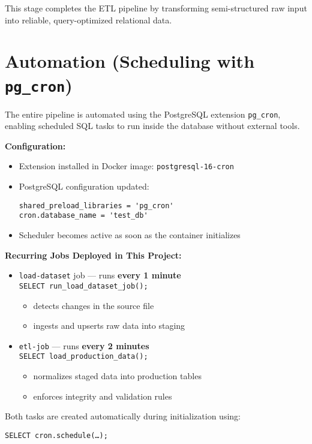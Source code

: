 \documentclass[11pt]{article}
\begin{document}
This stage completes the ETL pipeline by transforming semi-structured raw input into reliable, query-optimized relational data.

\section{Automation (Scheduling with \texttt{pg\_cron})}

The entire pipeline is automated using the PostgreSQL extension \texttt{pg\_cron}, enabling scheduled SQL tasks to run inside the database without external tools.

\textbf{Configuration:}
\begin{itemize}
\item Extension installed in Docker image: \texttt{postgresql-16-cron}
\item PostgreSQL configuration updated:
\begin{verbatim}
shared_preload_libraries = 'pg_cron'
cron.database_name = 'test_db'
\end{verbatim}
\item Scheduler becomes active as soon as the container initializes
\end{itemize}

\textbf{Recurring Jobs Deployed in This Project:}
\begin{itemize}[leftmargin=1.4em]
  \item \texttt{load-dataset} job — runs \textbf{every 1 minute} \\
        \texttt{SELECT run\_load\_dataset\_job();}
        \begin{itemize}
            \item detects changes in the source file
            \item ingests and upserts raw data into staging
        \end{itemize}

  \item \texttt{etl-job} — runs \textbf{every 2 minutes} \\
        \texttt{SELECT load\_production\_data();}
        \begin{itemize}
            \item normalizes staged data into production tables
            \item enforces integrity and validation rules
        \end{itemize}
\end{itemize}

Both tasks are created automatically during initialization using:
\begin{center}
\texttt{SELECT cron.schedule(\ldots);}
\end{center}
\end{document}
